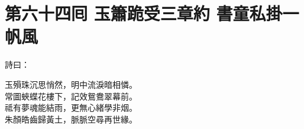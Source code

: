 
\chapter*{第六十四囘 玉簫跪受三章約 書童私掛一帆風}


詩曰：

\begin{myquote} 
玉殞珠沉思悄然，明中流淚暗相憐。\\常圖蛺蝶花樓下，記效鴛鴦翠幕前。\\祗有夢魂能結雨，更無心緒學非烟。\\朱顏皓齒歸黃土，脈脈空尋再世緣。
\end{myquote} 


